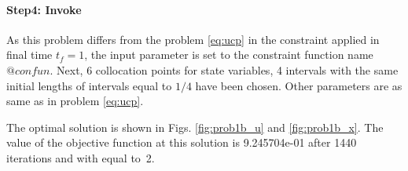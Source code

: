 \paragraph{Step4: Invoke~}

{\small }

As this problem differs from the problem \eqref{eq:ucp} in the
constraint applied in final time $t_{f} = 1$, the input parameter
 is set to the constraint function name
$@confun$. Next, 6 collocation points for state variables, 4 intervals
with the same initial lengths of intervals equal to $1/4$ have been
chosen. Other parameters are as same as in problem \eqref{eq:ucp}.

The optimal solution is shown in Figs. \ref{fig:prob1b_u} and
\ref{fig:prob1b_x}. The value of the objective function at this
solution is 9.245704e-01 after 1440 iterations and with 
equal to~2.

